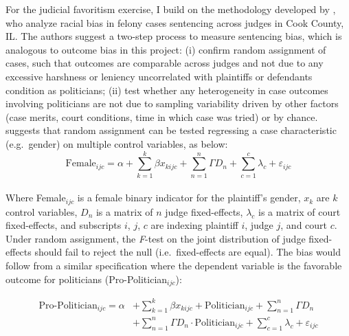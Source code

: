 \documentclass[11pt]{article}
\begin{document}
For the judicial favoritism exercise, I build on the methodology developed by \citet{AbramsJudgesVaryTheir2012}, who analyze racial bias in felony cases sentencing across judges in Cook County, IL. The authors suggest a two-step process to measure sentencing bias, which is analogous to outcome bias in this project: (i) confirm random assignment of cases, such that outcomes are comparable across judges and not due to any excessive harshness or leniency uncorrelated with plaintiffs or defendants condition as politicians; (ii) test whether any heterogeneity in case outcomes involving politicians are not due to sampling variability driven by other factors (case merits, court conditions, time in which case was tried) or by chance. \citet{AbramsJudgesVaryTheir2012} suggests that random assignment can be tested regressing a case characteristic (e.g.~gender) on multiple control variables, as below: \\

\begin{equation} \label{eq:methods1}
  \text{Female}_{ijc} = \alpha + \sum_{k=1}^{k} \beta x_{kijc} + \sum_{n=1}^{n} \Gamma D_{n} + \sum_{c=1}^{c} \lambda_{c} + \varepsilon_{ijc}
\end{equation} \\

Where Female$_{ijc}$ is a female binary indicator for the plaintiff's gender, $x_{k}$ are $k$ control variables, $D_{n}$ is a matrix of $n$ judge fixed-effects, $\lambda_{c}$ is a matrix of court fixed-effects, and subscripts $i$, $j$, $c$ are indexing plaintiff $i$, judge $j$, and court $c$. Under random assignment, the \emph{F}-test on the joint distribution of judge fixed-effects should fail to reject the null (i.e.~fixed-effects are equal). The bias would follow from a similar specification where the dependent variable is the favorable outcome for politicians (Pro-Politician$_{ijc}$):

\begin{equation}
  \begin{split} \label{eq:methods2}
    \text{Pro-Politician}_{ijc} = \alpha & + \sum_{k=1}^{k} \beta x_{kijc} + \text{Politician}_{ijc} + \sum_{n=1}^{n} \Gamma D_{n} \\
    & + \sum_{n=1}^{n} \Gamma D_{n} \cdot \text{Politician}_{ijc} + \sum_{c=1}^{c} \lambda_{c} + \varepsilon_{ijc}
  \end{split}
\end{equation} \\
\end{document}
